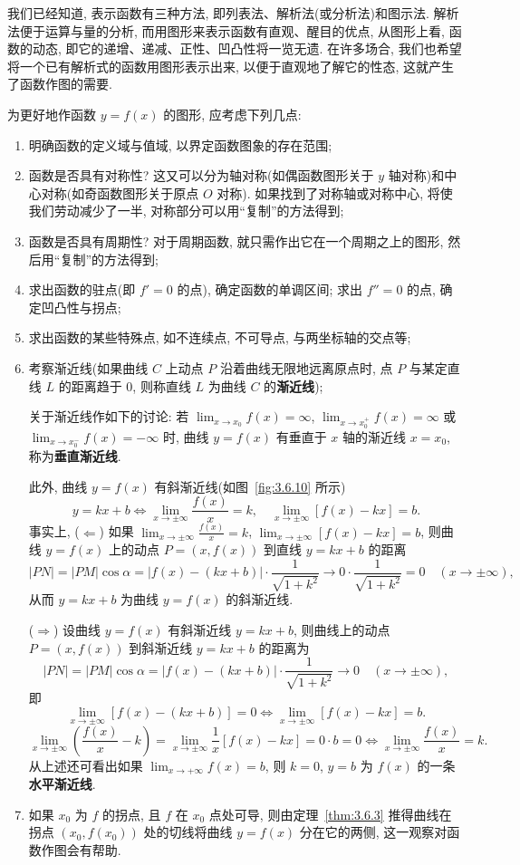 我们已经知道, 表示函数有三种方法, 即列表法、解析法(或分析法)和图示法. 解析法便于运算与量的分析, 而用图形来表示函数有直观、醒目的优点, 从图形上看, 函数的动态, 即它的递增、递减、正性、凹凸性将一览无遗. 在许多场合, 我们也希望将一个已有解析式的函数用图形表示出来, 以便于直观地了解它的性态, 这就产生了函数作图的需要.

为更好地作函数 $y=f(x)$ 的图形, 应考虑下列几点:
\begin{enumerate}[label=(\arabic*)]
  \item 明确函数的定义域与值域, 以界定函数图象的存在范围;
  \item 函数是否具有对称性? 这又可以分为轴对称(如偶函数图形关于 $y$ 轴对称)和中心对称(如奇函数图形关于原点 $O$ 对称). 如果找到了对称轴或对称中心, 将使我们劳动减少了一半, 对称部分可以用“复制”的方法得到;
  \item 函数是否具有周期性? 对于周期函数, 就只需作出它在一个周期之上的图形, 然后用“复制”的方法得到;
  \item 求出函数的驻点(即 $f'=0$ 的点), 确定函数的单调区间; 求出 $f''=0$ 的点, 确定凹凸性与拐点;
  \item 求出函数的某些特殊点, 如不连续点, 不可导点, 与两坐标轴的交点等;
  \item 考察渐近线(如果曲线 $C$ 上动点 $P$ 沿着曲线无限地远离原点时, 点 $P$ 与某定直线 $L$ 的距离趋于 $0$, 则称直线 $L$ 为曲线 $C$ 的\textbf{渐近线});

  关于渐近线作如下的讨论: 若 $\lim_{x\to x_0}f(x)=\infty$, $\lim_{x\to x_0^{+}}f(x)=\infty$ 或 $\lim_{x\to x_0^{-}}f(x)=-\infty$ 时, 曲线 $y=f(x)$ 有垂直于 $x$ 轴的渐近线 $x=x_{0}$, 称为\textbf{垂直渐近线}.

  此外, 曲线 $y=f(x)$ 有斜渐近线(如图~\ref{fig:3.6.10} 所示)
  \[
  y=kx+b\Longleftrightarrow \lim_{x\to\pm\infty}\frac{f(x)}{x}=k,\quad \lim_{x\to\pm\infty}[f(x)-kx]=b.
\]
  事实上, ($\Longleftarrow$) 如果 $\lim_{x\to\pm\infty}\frac{f(x)}{x}=k$, $\lim_{x\to\pm\infty}[f(x)-kx]=b$, 则曲线 $y=f(x)$ 上的动点 $P=(x,f(x))$ 到直线 $y=kx+b$ 的距离
  \[
  |PN|=|PM|\cos\alpha=|f(x)-(kx+b)|\cdot\frac{1}{\sqrt{1+k^2}}\to 0\cdot\frac{1}{\sqrt{1+k^2}}=0\quad(x\to\pm\infty),
\]
  从而 $y=kx+b$ 为曲线 $y=f(x)$ 的斜渐近线.

  ($\Longrightarrow$) 设曲线 $y=f(x)$ 有斜渐近线 $y=kx+b$, 则曲线上的动点 $P=(x,f(x))$ 到斜渐近线 $y=kx+b$ 的距离为
  \[
  |PN|=|PM|\cos\alpha=|f(x)-(kx+b)|\cdot\frac{1}{\sqrt{1+k^{2}}}\to 0\quad(x\to\pm\infty),
\]
  即
  \[
  \lim_{x\to\pm\infty}[f(x)-(kx+b)]=0\Longleftrightarrow \lim_{x\to\pm\infty}[f(x)-kx]=b.
\]
  \[
  \lim_{x\to\pm\infty}\left(\frac{f(x)}{x}-k\right)=\lim_{x\to\pm\infty}\frac{1}{x}[f(x)-kx]=0\cdot b=0\Longleftrightarrow \lim_{x\to\pm\infty}\frac{f(x)}{x}=k.
\]
  从上述还可看出如果 $\lim_{x\to+\infty}f(x)=b$, 则 $k=0$, $y=b$ 为 $f(x)$ 的一条\textbf{水平渐近线}.

  \item 如果 $x_{0}$ 为 $f$ 的拐点, 且 $f$ 在 $x_{0}$ 点处可导, 则由定理~\ref{thm:3.6.3} 推得曲线在拐点 $(x_{0},f(x_{0}))$ 处的切线将曲线 $y=f(x)$ 分在它的两侧, 这一观察对函数作图会有帮助.
\end{enumerate}

